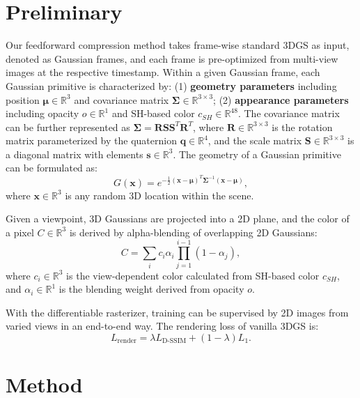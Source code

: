\documentclass[letterpaper]{article} %
\begin{document}
\section{Preliminary}
Our feedforward compression method takes frame-wise standard 3DGS as input, denoted as Gaussian frames, and each frame is pre-optimized from multi-view images at the respective timestamp.  Within a given Gaussian frame, each Gaussian primitive is characterized by: (1) \textbf{geometry parameters} including position $\boldsymbol{\mu} \in \mathbb{R}^3$ and covariance matrix $\boldsymbol{\Sigma} \in \mathbb{R}^{3\times3}$; (2) \textbf{appearance parameters} including opacity $o \in \mathbb{R}^1$ and SH-based color $c_{SH} \in \mathbb{R}^{48}$. The covariance matrix can be further represented as $\boldsymbol{\Sigma } = \boldsymbol{R}\boldsymbol{S}\boldsymbol{S}^T\boldsymbol{R}^T$, where $\boldsymbol{R} \in \mathbb{R}^{3\times3}$ is the rotation matrix parameterized by the quaternion $\boldsymbol{q} \in \mathbb{R}^4$,  and the scale matrix $\boldsymbol{S} \in \mathbb{R}^{3\times3}$ is a diagonal matrix with elements $\boldsymbol{s} \in \mathbb{R}^3$. The geometry of a Gaussian primitive can be formulated as:
\begin{equation}
  G(\boldsymbol{x}) = e^{-\frac{1}{2}(\boldsymbol{x} - \boldsymbol{\mu})^T \boldsymbol{\Sigma}^{-1} (\boldsymbol{x} - \boldsymbol{\mu})}, 
\end{equation}
where $\boldsymbol{x} \in \mathbb{R}^3$ is any random 3D location within the scene. 

Given a viewpoint, 3D Gaussians are projected into a 2D plane, and the color of a pixel $C \in \mathbb{R}^3$ is derived by alpha-blending of overlapping 2D Gaussians:
\begin{equation}
  C = \sum_i c_i \alpha_i \prod_{j=1}^{i-1} (1-\alpha_j), 
\end{equation}
where $c_i \in \mathbb{R}^3$ is the view-dependent color calculated from SH-based color $c_{SH}$, and $\alpha_i \in \mathbb{R}^1$ is the blending weight derived from opacity $o$.

With the differentiable rasterizer, training can be supervised by 2D images from varied views in an end-to-end way. The rendering loss of vanilla 3DGS is:
\begin{equation}
  L_{\text{render}} = \lambda L_{\text{D-SSIM}} + (1-\lambda) L_1.
\end{equation}


\section{Method}
\end{document}
